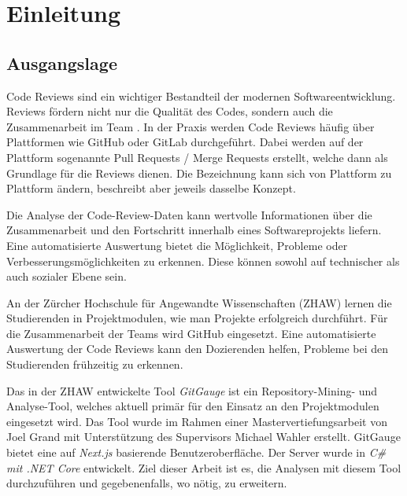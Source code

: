 


\chapter{Einleitung} %


\label{Chapter1} %


\section{Ausgangslage}
\label{sec:Ausgangslage} 
Code Reviews sind ein wichtiger Bestandteil der modernen Softwareentwicklung. Reviews fördern nicht nur die Qualität des Codes, sondern auch die Zusammenarbeit im Team \parencite{dos_santos_investigating_2018}. In der Praxis werden Code Reviews häufig über Plattformen wie GitHub oder GitLab durchgeführt. Dabei werden auf der Plattform sogenannte Pull Requests / Merge Requests erstellt, welche dann als Grundlage für die Reviews dienen. Die Bezeichnung kann sich von Plattform zu Plattform ändern, beschreibt aber jeweils dasselbe Konzept. \parencite{kansab_analyzing_2025}


Die Analyse der Code-Review-Daten kann wertvolle Informationen über die Zusammenarbeit und den Fortschritt innerhalb eines Softwareprojekts liefern. Eine automatisierte Auswertung bietet die Möglichkeit, Probleme oder Verbesserungsmöglichkeiten zu erkennen. Diese können sowohl auf technischer als auch sozialer Ebene sein. 

An der Zürcher Hochschule für Angewandte Wissenschaften (ZHAW) lernen die Studierenden in Projektmodulen, wie man Projekte erfolgreich durchführt. Für die Zusammenarbeit der Teams wird GitHub eingesetzt. Eine automatisierte Auswertung der Code Reviews kann den Dozierenden helfen, Probleme bei den Studierenden frühzeitig zu erkennen.

Das in der ZHAW entwickelte Tool \textit{GitGauge} ist ein Repository-Mining- und Analyse-Tool, welches aktuell primär für den Einsatz an den Projektmodulen eingesetzt wird. Das Tool wurde im Rahmen einer Mastervertiefungsarbeit von Joel Grand mit Unterstützung des Supervisors Michael Wahler erstellt. GitGauge bietet eine auf \textit{Next.js} basierende Benutzeroberfläche. Der Server wurde in \textit{C\# mit .NET Core } entwickelt. Ziel dieser Arbeit ist es, die Analysen mit diesem Tool durchzuführen und gegebenenfalls, wo nötig, zu erweitern. \parencite{grand_joel_wahler_michael_waspe_lara_stumpf_simon_repo_nodate}

